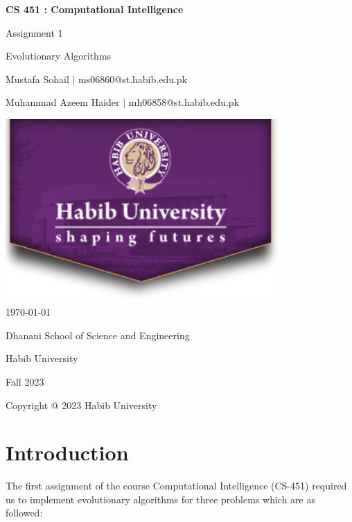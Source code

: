\documentclass[12pt]{article}
\begin{document}
\begin{titlepage}
    \centering
    {\LARGE\textbf{CS 451 : Computational Intelligence}\par}
    \vspace{0.5cm}
    {\Large Assignment 1\par}
    \vspace{0.2cm}
    {\Large Evolutionary Algorithms\par}
    \vspace*{\fill} %
    {\large Mustafa Sohail $\mid$ ms06860@st.habib.edu.pk\par}
    {\large Muhammad Azeem Haider $\mid$ mh06858@st.habib.edu.pk\par}
    \vspace{2cm}
    \includegraphics[height=7cm]{HU_logo}\\\bigskip
    {\large \today}\\\bigskip\bigskip
    \vspace{1cm}
    \vspace{2cm}
    {\large Dhanani School of Science and Engineering\par}
    {\large Habib University\par}
    {\large Fall 2023\par}
    \vspace*{\fill} %
    {\large Copyright @ 2023 Habib University\par}
\end{titlepage}

\thispagestyle{empty} %
\tableofcontents
\clearpage

\section{Introduction}
The first assignment of the course Computational Intelligence (CS-451) required us to implement evolutionary algorithms for three problems which are as followed:
\end{document}

